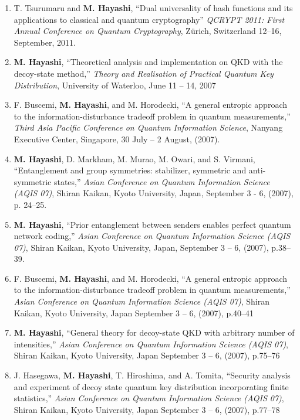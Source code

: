 \documentclass[a4paper,12pt,oneside]{article}
\begin{document}
\begin{enumerate}
\item 
T. Tsurumaru and \textbf{M. Hayashi}, ``Dual universality of hash functions and its applications to classical and quantum cryptography'' 
{\em QCRYPT 2011: First Annual Conference on Quantum Cryptography}, 
Z\"{u}rich, Switzerland 12--16, September, 2011.

\item
\textbf{M. Hayashi}, ``Theoretical analysis and implementation on QKD with the decoy-state method,'' 
{\em Theory and Realisation of Practical Quantum Key Distribution}, 
University of Waterloo, June 11 -- 14, 2007

\item
F. Buscemi, \textbf{M. Hayashi}, and M. Horodecki, ``A general entropic approach to the information-disturbance tradeoff problem in quantum measurements,'' 
{\em Third Asia Pacific Conference on Quantum Information Science}, 
Nanyang Executive Center, Singapore, 
30 July -- 2 August, (2007).

\item
\textbf{M. Hayashi}, D. Markham, M. Murao, M. Owari, and S. Virmani, ``Entanglement and group symmetries: stabilizer, symmetric and anti-symmetric states,'' 
{\em Asian Conference on Quantum Information Science (AQIS 07)}, 
Shiran Kaikan, Kyoto University, Japan, September 3 - 6, (2007), p. 24--25.

\item
\textbf{M. Hayashi}, ``Prior entanglement between senders enables perfect quantum network coding,'' {\em Asian Conference on Quantum Information Science (AQIS 07)}, 
Shiran Kaikan, Kyoto University, Japan, 
September 3 -- 6, (2007), p.38--39.

\item
F. Buscemi, \textbf{M. Hayashi}, and M. Horodecki, ``A general entropic approach to the information-disturbance tradeoff problem in quantum measurements,'' 
{\em Asian Conference on Quantum Information Science (AQIS 07)}, 
Shiran Kaikan, Kyoto University, Japan September 3 -- 6, (2007), p.40--41

\item
\textbf{M. Hayashi}, ``General theory for decoy-state QKD with arbitrary number of intensities,'' 
{\em Asian Conference on Quantum Information Science (AQIS 07)}, 
Shiran Kaikan, Kyoto University, Japan September 3 -- 6, (2007), p.75--76

\item
J. Hasegawa, \textbf{M. Hayashi}, T. Hiroshima, and A. Tomita, 
``Security analysis and experiment of decoy state quantum key distribution incorporating finite statistics,'' 
{\em Asian Conference on Quantum Information Science (AQIS 07)}, 
Shiran Kaikan, Kyoto University, Japan September 3 -- 6, (2007), p.77--78


\end{enumerate}
\end{document}
